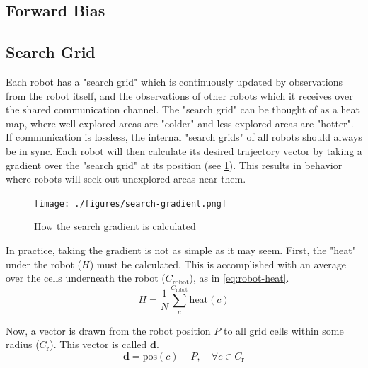 
\subsection{Forward Bias}

\subsection{Search Grid}

Each robot has a "search grid" which is continuously updated by observations from the robot itself, and the observations of other robots which it receives over the shared communication channel. The "search grid" can be thought of as a heat map, where well-explored areas are "colder" and less explored areas are "hotter". If communication is lossless, the internal "search grids" of all robots should always be in sync. Each robot will then calculate its desired trajectory vector by taking a gradient over the "search grid" at its position (see \cref{fig:search-gradient}). This results in behavior where robots will seek out unexplored areas near them. \\
\begin{figure}[h]
    \begin{center}
        \texttt{[image: ./figures/search-gradient.png]}
    \end{center}
    \caption{How the search gradient is calculated}
    \label{fig:search-gradient}
\end{figure}


In practice, taking the gradient is not as simple as it may seem. First, the "heat" under the robot ($H$) must be calculated. This is accomplished with an average over the cells underneath the robot ($C_\mathrm{robot}$), as in \cref{eq:robot-heat}.
\begin{equation}
\label{eq:robot-heat}
    H = \frac{1}{N} \sum_c^{C_\mathrm{robot}} \mathrm{heat}(c)
\end{equation}

Now, a vector is drawn from the robot position $P$ to all grid cells within some radius ($C_\mathrm{r}$). This vector is called $\mathbf{d}$.
\begin{equation}
    \mathbf{d} = \mathrm{pos}(c) - P, \quad \forall c \in C_\mathrm{r}
\end{equation}

